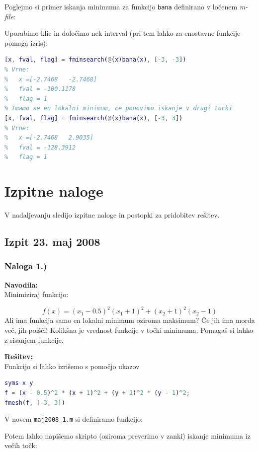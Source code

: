 \documentclass[a4paper,11pt]{article}
\begin{document}
Poglejmo si primer iskanja minimuma za funkcijo \texttt{bana} definirano v ločenem \textit{m-file}:

Uporabimo klic in določimo nek interval (pri tem lahko za enostavne funkcije pomaga izris):
\begin{lstlisting}[label=minsearch_sample_call,language=Matlab]
% Funkcija vraca tocko x, vrednost minimuma fval, in zastavico flag (katero opazujemo da je 1 - pomeni da je najdena ustrezna resitev)
[x, fval, flag] = fminsearch(@(x)bana(x), [-3, -3])
% Vrne:
%	x =[-2.7468   -2.7468]
%	fval = -100.1178
%	flag = 1
% Imamo se en lokalni minimum, ce ponovimo iskanje v drugi tocki
[x, fval, flag] = fminsearch(@(x)bana(x), [-3, 3])
% Vrne:
%	x =[-2.7468   2.9035]
%	fval = -128.3912
%	flag = 1
\end{lstlisting}


\section{Izpitne naloge}

V nadaljevanju sledijo izpitne naloge in postopki za pridobitev rešitev.
\newpage

\subsection{Izpit 23. maj 2008}

\subsubsection{Naloga 1.)}
\label{task:maj2008_1}

\textbf{Navodila:} \\ 
Minimiziraj funkcijo:

\begin{equation} \label{eq:maj2008_1}
f(x) = (x_1 - 0.5)^2 (x_1 + 1)^2 + (x_2 + 1)^2 (x_2 - 1)
\end{equation}
Ali ima funkcija samo en lokalni minimum oziroma maksimum? Če jih ima morda več, jih poišči! Kolikšna je vrednost funkcije v točki minimuma. Pomagaš si lahko z risanjem funkcije.

\vspace{5mm}
\noindent \textbf{Rešitev:} \\ 
Funkcijo si lahko izrišemo s pomočjo ukazov

\begin{lstlisting}[language=Matlab]
syms x y
f = (x - 0.5)^2 * (x + 1)^2 + (y + 1)^2 * (y - 1)^2;
fmesh(f, [-3, 3])
\end{lstlisting}
V novem \texttt{maj2008\_1.m} si definiramo funkcijo:

Potem lahko napišemo skripto (oziroma preverimo v zanki) iskanje minimuma iz večih točk:
\end{document}
